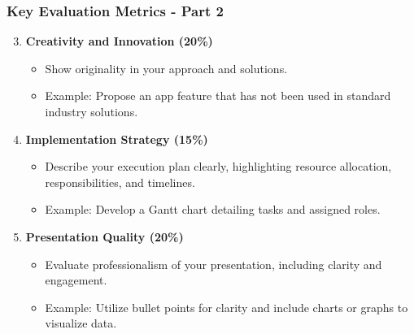 \documentclass[aspectratio=169]{beamer}
\begin{document}
\begin{frame}[fragile]
    \frametitle{Key Evaluation Metrics - Part 2}
    \begin{enumerate}
        \setcounter{enumi}{2}
        \item \textbf{Creativity and Innovation (20\%)}
        \begin{itemize}
            \item Show originality in your approach and solutions.
            \item Example: Propose an app feature that has not been used in standard industry solutions.
        \end{itemize}
        
        \item \textbf{Implementation Strategy (15\%)}
        \begin{itemize}
            \item Describe your execution plan clearly, highlighting resource allocation, responsibilities, and timelines.
            \item Example: Develop a Gantt chart detailing tasks and assigned roles.
        \end{itemize}
        
        \item \textbf{Presentation Quality (20\%)}
        \begin{itemize}
            \item Evaluate professionalism of your presentation, including clarity and engagement.
            \item Example: Utilize bullet points for clarity and include charts or graphs to visualize data.
        \end{itemize}
    \end{enumerate}
\end{frame}
\end{document}
